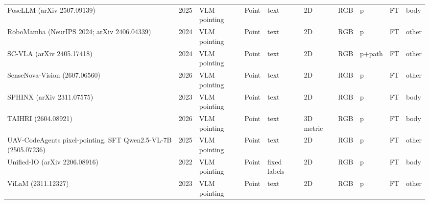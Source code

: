 {\begin{landscape}
\begin{longtable}{@{}p{4.6cm}rp{2.0cm}lllllcl@{}}
PoseLLM (arXiv 2507.09139) & 2025 & VLM pointing & Point & text & 2D & RGB & p & FT & body \\
RoboMamba (NeurIPS 2024; arXiv 2406.04339) & 2024 & VLM pointing & Point & text & 2D & RGB & p & FT & other \\
SC-VLA (arXiv 2405.17418) & 2024 & VLM pointing & Point & text & 2D & RGB & p+path & FT & other \\
SenseNova-Vision (2607.06560) & 2026 & VLM pointing & Point & text & 2D & RGB & p & FT & other \\
SPHINX (arXiv 2311.07575) & 2023 & VLM pointing & Point & text & 2D & RGB & p & FT & body \\
TAIHRI (2604.08921) & 2026 & VLM pointing & Point & text & 3D metric & RGB & p & FT & body \\
UAV-CodeAgents pixel-pointing, SFT Qwen2.5-VL-7B (2505.07236) & 2025 & VLM pointing & Point & text & 2D & RGB & p & FT & other \\
Unified-IO (arXiv 2206.08916) & 2022 & VLM pointing & Point & fixed labels & 2D & RGB & p & FT & body \\
ViLaM (2311.12327) & 2023 & VLM pointing & Point & text & 2D & RGB & p & FT & other \\
\end{longtable}

\end{landscape}}
